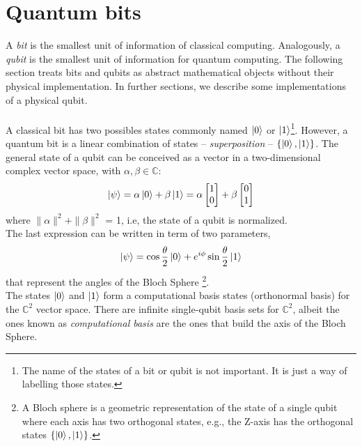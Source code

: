 \section{Quantum bits}
A \textit{bit} is the smallest unit of information of classical computing. Analogously, a \textit{qubit} is the smallest unit of information for quantum computing. The following section treats bits and qubits as abstract mathematical objects without their physical implementation. In further sections, we describe some implementations of a physical qubit.\\\\
A classical bit has two possibles states commonly named $\ket{0}$ or $\ket{1}$\footnote{The name of the states of a bit or qubit is not important. It is just a way of labelling those states.}. However, a quantum bit is a linear combination of states -- \textit{superposition} -- $\{\ket{0}, \ket{1}\}$. The general state of a qubit can be conceived as a vector in a two-dimensional complex vector space, with $\alpha, \beta \in \mathbb{C}$:
\begin{equation}
    \ket{\psi} = \alpha \ket{0} + \beta \ket{1} = \alpha \begin{bmatrix}
           1 \\
           0 
         \end{bmatrix}
         +
         \beta
         \begin{bmatrix}
           0 \\
           1 
         \end{bmatrix}
\end{equation}
where $\|\alpha\|^{2} + \|\beta\|^{2}$ = 1, i.e, the state of a qubit is normalized.\\
The last expression can be written in term of two parameters,
\begin{equation}
    \ket{\psi} = \cos{\frac{\theta}{2}}\ket{0} + e^{i\phi}\sin{\frac{\theta}{2}}\ket{1}
\end{equation}
that represent the angles of the Bloch Sphere \footnote{A Bloch sphere is a geometric representation of the state of a single qubit where each axis has two orthogonal states, e.g., the Z-axis has the orthogonal states $\{\ket{0},\ket{1}\}$.}.\\
The states $\ket{0}$ and $\ket{1}$ form a computational basis states (orthonormal basis) for the $\mathbb{C}^{2}$ vector space. There are infinite single-qubit basis sets for $\mathbb{C}^{2}$, albeit the ones known as \textit{computational basis} are the ones that build the axis of the Bloch Sphere.

